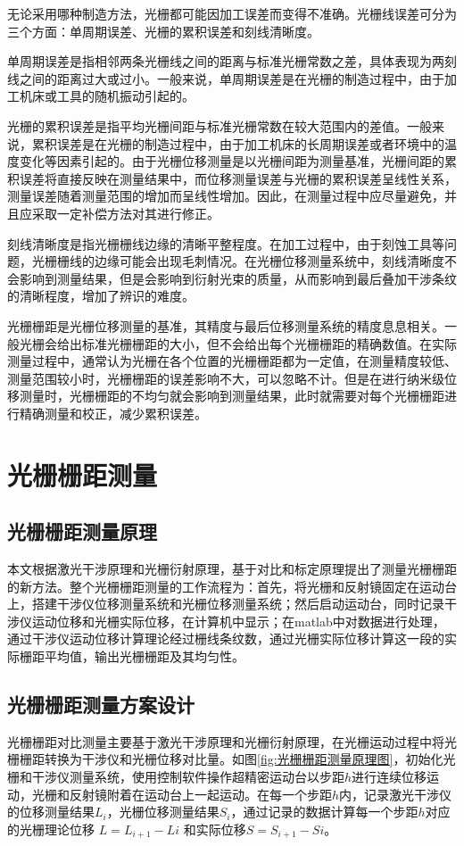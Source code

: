 \documentclass[type=master,oneside]{fduthesis}
\begin{document}
无论采用哪种制造方法，光栅都可能因加工误差而变得不准确。光栅线误差可分为三个方面：单周期误差、光栅的累积误差和刻线清晰度。

单周期误差是指相邻两条光栅线之间的距离与标准光栅常数之差，具体表现为两刻线之间的距离过大或过小。一般来说，单周期误差是在光栅的制造过程中，由于加工机床或工具的随机振动引起的。

光栅的累积误差是指平均光栅间距与标准光栅常数在较大范围内的差值。一般来说，累积误差是在光栅的制造过程中，由于加工机床的长周期误差或者环境中的温度变化等因素引起的。由于光栅位移测量是以光栅间距为测量基准，光栅间距的累积误差将直接反映在测量结果中，而位移测量误差与光栅的累积误差呈线性关系，测量误差随着测量范围的增加而呈线性增加。因此，在测量过程中应尽量避免，并且应采取一定补偿方法对其进行修正。

刻线清晰度是指光栅栅线边缘的清晰平整程度。在加工过程中，由于刻蚀工具等问题，光栅栅线的边缘可能会出现毛刺情况。在光栅位移测量系统中，刻线清晰度不会影响到测量结果，但是会影响到衍射光束的质量，从而影响到最后叠加干涉条纹的清晰程度，增加了辨识的难度。

光栅栅距是光栅位移测量的基准，其精度与最后位移测量系统的精度息息相关。一般光栅会给出标准光栅栅距的大小，但不会给出每个光栅栅距的精确数值。在实际测量过程中，通常认为光栅在各个位置的光栅栅距都为一定值，在测量精度较低、测量范围较小时，光栅栅距的误差影响不大，可以忽略不计。但是在进行纳米级位移测量时，光栅栅距的不均匀就会影响到测量结果，此时就需要对每个光栅栅距进行精确测量和校正，减少累积误差。

\section{光栅栅距测量}
\subsection{光栅栅距测量原理}
本文根据激光干涉原理和光栅衍射原理，基于对比和标定原理提出了测量光栅栅距的新方法。整个光栅栅距测量的工作流程为：首先，将光栅和反射镜固定在运动台上，搭建干涉仪位移测量系统和光栅位移测量系统；然后启动运动台，同时记录干涉仪运动位移和光栅实际位移，在计算机中显示；在matlab中对数据进行处理，通过干涉仪运动位移计算理论经过栅线条纹数，通过光栅实际位移计算这一段的实际栅距平均值，输出光栅栅距及其均匀性。

\subsection{光栅栅距测量方案设计}
光栅栅距对比测量主要基于激光干涉原理和光栅衍射原理，在光栅运动过程中将光栅栅距转换为干涉仪和光栅位移对比量。如图\ref{fig:光栅栅距测量原理图}，初始化光栅和干涉仪测量系统，使用控制软件操作超精密运动台以步距$ h $进行连续位移运动，光栅和反射镜附着在运动台上一起运动。在每一个步距$ h $内，记录激光干涉仪的位移测量结果$ L_{i} $，光栅位移测量结果$ S_{i} $，通过记录的数据计算每一个步距$ h $对应的光栅理论位移 $ L=L_{i+1} - L{i} $ 和实际位移$ S=S_{i+1} - S{i} $。
\end{document}
